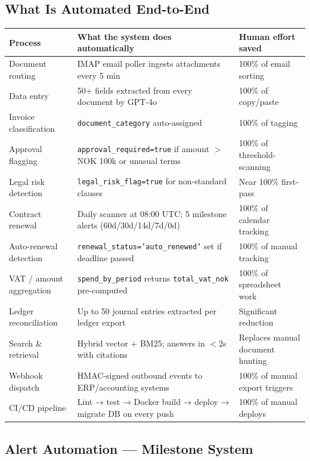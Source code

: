 \documentclass[12pt,a4paper]{article}
\newcommand{\codeinline}[1]{\texttt{\small\color{NordicBlue}#1}}
\begin{document}
\subsection{What Is Automated End-to-End}

\begin{tabularx}{\textwidth}{lXl}
\toprule
\textbf{Process} & \textbf{What the system does automatically} & \textbf{Human effort saved} \\
\midrule
Document routing      & IMAP email poller ingests attachments every 5 min & 100\% of email sorting \\
Data entry            & 50+ fields extracted from every document by GPT-4o & 100\% of copy/paste \\
Invoice classification & \codeinline{document\_category} auto-assigned & 100\% of tagging \\
Approval flagging     & \codeinline{approval\_required=true} if amount $>$ NOK 100k or unusual terms & 100\% of threshold-scanning \\
Legal risk detection  & \codeinline{legal\_risk\_flag=true} for non-standard clauses & Near 100\% first-pass \\
Contract renewal      & Daily scanner at 08:00 UTC; 5 milestone alerts (60d/30d/14d/7d/0d) & 100\% of calendar tracking \\
Auto-renewal detection & \codeinline{renewal\_status='auto\_renewed'} set if deadline passed & 100\% of manual tracking \\
VAT / amount aggregation & \codeinline{spend\_by\_period} returns \codeinline{total\_vat\_nok} pre-computed & 100\% of spreadsheet work \\
Ledger reconciliation & Up to 50 journal entries extracted per ledger export & Significant reduction \\
Search \& retrieval   & Hybrid vector + BM25; answers in $<$2s with citations & Replaces manual document hunting \\
Webhook dispatch      & HMAC-signed outbound events to ERP/accounting systems & 100\% of manual export triggers \\
CI/CD pipeline        & Lint → test → Docker build → deploy → migrate DB on every push & 100\% of manual deploys \\
\bottomrule
\end{tabularx}

\subsection{Alert Automation — Milestone System}
\end{document}

